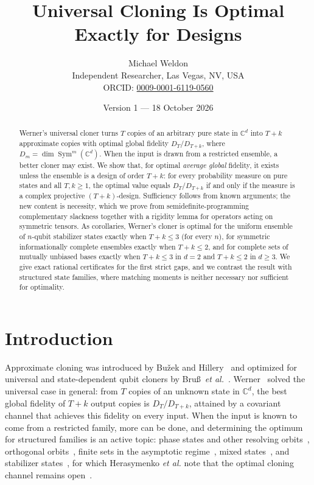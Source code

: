 \documentclass[11pt]{article}
\title{Universal Cloning Is Optimal Exactly for Designs}
\author{Michael Weldon\\[2pt]
\small Independent Researcher, Las Vegas, NV, USA\\
\small ORCID: \href{https://orcid.org/0009-0001-6119-0560}{0009-0001-6119-0560}}
\date{Version 1 --- 18 October 2026}
\newcommand{\C}{\mathbb{C}}
\newcommand{\Sym}{\operatorname{Sym}}
\theoremstyle{definition}
\theoremstyle{remark}
\begin{document}
\maketitle

\begin{abstract}
Werner's universal cloner turns $T$ copies of an arbitrary pure state in $\C^d$ into $T+k$ approximate copies with
optimal global fidelity $D_T/D_{T+k}$, where $D_m=\dim\Sym^m(\C^d)$. When the input is drawn from a restricted
ensemble, a better cloner may exist. We show that, for optimal \emph{average global} fidelity, it exists unless the
ensemble is a design of order $T+k$: for every probability measure on pure states and all $T,k\ge1$, the
optimal value equals $D_T/D_{T+k}$ if and only if the measure is a complex projective $(T+k)$-design. Sufficiency
follows from known arguments; the new content is necessity, which we prove from semidefinite-programming
complementary slackness together with a rigidity lemma for operators acting on symmetric tensors. As corollaries,
Werner's cloner is optimal for the uniform ensemble of $n$-qubit stabilizer states exactly when $T+k\le3$ (for every
$n$), for symmetric informationally complete ensembles exactly when $T+k\le2$, and for complete sets of mutually
unbiased bases exactly when $T+k\le3$ in $d=2$ and $T+k\le2$ in $d\ge3$. We give exact rational certificates for
the first strict gaps, and we contrast the result with structured state families, where matching moments is neither
necessary nor sufficient for optimality.
\end{abstract}

\section{Introduction}
Approximate cloning was introduced by Bu\v{z}ek and Hillery~\cite{BuzekHillery1996} and optimized for universal and
state-dependent qubit cloners by Bru\ss\ \emph{et al.}~\cite{Bruss1998}. Werner~\cite{Werner1998} solved the universal
case in general: from $T$ copies of an
unknown state in $\C^d$, the best global fidelity of $T+k$ output copies is $D_T/D_{T+k}$, attained by a covariant
channel that achieves this fidelity on every input. When the input is known to come from a restricted family, more
can be done, and determining the optimum for structured families is an active topic: phase states and other resolving
orbits~\cite{Herasymenko2026}, orthogonal orbits~\cite{CwiklinskiStudzinski2026}, finite sets in the asymptotic
regime~\cite{ChiribellaYang2014}, mixed states~\cite{Fanizza2026}, and stabilizer states~\cite{Bansal2026}, for which
Herasymenko \emph{et al.} note that the optimal cloning channel remains open~\cite{Herasymenko2026}.
\end{document}
